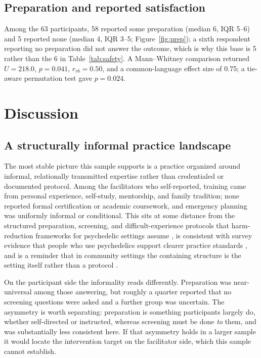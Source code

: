 \documentclass[12pt]{article}
\begin{document}
\subsection{Preparation and reported satisfaction}

Among the 63 participants, 58 reported some preparation (median 6, IQR 5--6) and 5 reported none (median 4,
IQR 3--5; Figure~\ref{fig:prep}); a sixth respondent reporting no preparation did not answer the outcome,
which is why this base is 5 rather than the 6 in Table~\ref{tab:safety}. A Mann--Whitney comparison returned
$U=218.0$, $p=0.041$, $r_{rb}=0.50$, and a common-language effect size of 0.75; a tie-aware permutation test
gave $p=0.024$.

\section{Discussion}

\subsection{A structurally informal practice landscape}

The most stable picture this sample supports is a practice organized around informal, relationally
transmitted expertise rather than credentialed or documented protocol. Among the facilitators who
self-reported, training came from personal experience, self-study, mentorship, and family tradition; none
reported formal certification or academic coursework, and emergency planning was uniformly informal or
conditional. This sits at some distance from the structured preparation, screening, and difficult-experience
protocols that harm-reduction frameworks for psychedelic settings assume \citep{dutton2025harm}, is
consistent with survey evidence that people who use psychedelics support clearer practice standards
\citep{kruger2023preferences}, and is a reminder that in community settings the containing structure is the
setting itself rather than a protocol \citep{hartogsohn2017constructing}.

On the participant side the informality reads differently. Preparation was near-universal among those
answering, but roughly a quarter reported that no screening questions were asked and a further group was
uncertain. The asymmetry is worth separating: preparation is something participants largely do, whether
self-directed or instructed, whereas screening must be done \emph{to} them, and was substantially less
consistent here. If that asymmetry holds in a larger sample it would locate the intervention target on the
facilitator side, which this sample cannot establish.
\end{document}
